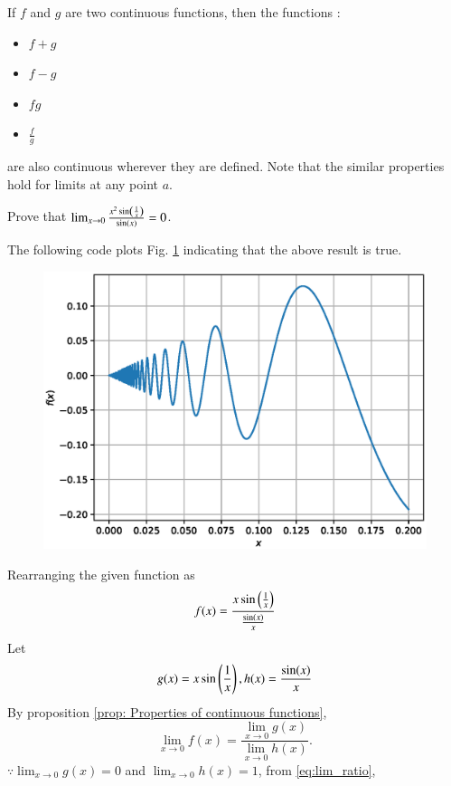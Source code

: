 \documentclass[journal,12pt,twocolumn]{IEEEtran}
\begin{document}
\begin{proposition}
\label{prop: Properties of continuous functions}
If $f$ and $g$ are two continuous functions, then the functions :
\begin{itemize}
\item $f+g$
\item $f-g$
\item $fg$
\item $\frac{f}{g}$
\end{itemize}
are also continuous wherever they are defined. Note that the similar properties hold for limits at any point $a$.
\end{proposition}
\begin{problem}
Prove that $\lim_{x\to 0}\frac{x^2 \sin\left(\frac{1}{x}\right)}{\sin(x)}=0$. 
\end{problem}
\solution The following code plots Fig. \ref{fig:5} indicating that the above result is true.

\begin{figure}[!ht]
\begin{center}
\includegraphics[width=\columnwidth]{./figs/5.eps}
\end{center}
\label{fig:5}	
\end{figure} 
%
Rearranging the given function as
\begin{equation}
f(x)=\frac{x \sin\left(\frac{1}{x}\right)}{\frac{\sin(x)}{x}}
\end{equation}
Let 
\begin{equation}
g(x)=x \sin\left(\frac{1}{x}\right), h(x)=\frac{\sin(x)}{x}
\end{equation}
%
By proposition \ref{prop: Properties of continuous functions}, 
\begin{equation}
\label{eq:lim_ratio}
\lim_{x \to 0}f(x)= \frac{\lim_{x\to 0}g(x)}{\lim_{x\to 0}h(x)}.
\end{equation}
%
$\because \lim_{x \to 0} g(x) = 0$ and  $\lim_{x \to 0} h(x) = 1$, from \eqref{eq:lim_ratio},
\end{document}
